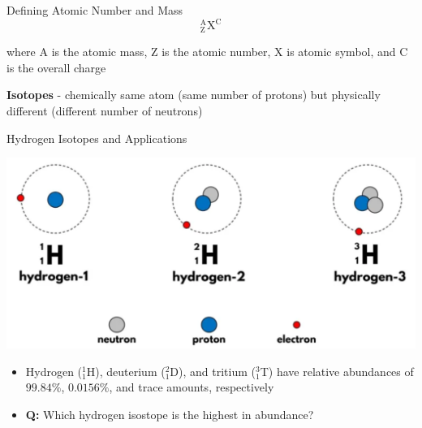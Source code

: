 \documentclass[11pt]{beamer}
\begin{document}
\begin{frame}{Defining Atomic Number and Mass}
  \begin{equation}
    ^\text{A}_\text{Z}\text{X}^\text{C}
  \end{equation}

  where A is the atomic mass, Z is the atomic number, X is atomic
  symbol, and C is the overall charge

  \textbf{Isotopes} - chemically same atom (same number of protons)
  but physically different (different number of neutrons)
\end{frame}

\begin{frame}{Hydrogen Isotopes and Applications}
  \begin{center}
    \includegraphics[width=0.75\linewidth]{hydro_iso}
  \end{center}

  \begin{itemize}
  \item Hydrogen ($^1_1$H), deuterium ($^2_1$D), and tritium ($^3_1$T)
    have relative abundances of $99.84\%$, $0.0156\%$, and trace amounts,
    respectively
  \item \textbf{Q:} Which hydrogen isostope is the highest in abundance?
  \end{itemize}
\end{frame}
\end{document}
